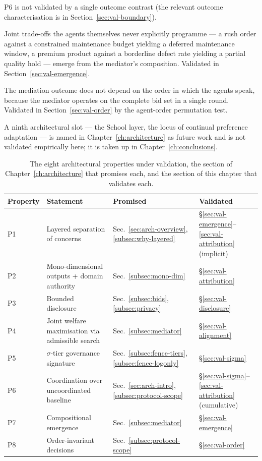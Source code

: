 \begin{description}[leftmargin=2.4em,style=nextline,itemsep=0.25em]
    P6 is not validated by a single outcome contrast (the relevant
    outcome characterisation is in Section~\ref{sec:val-boundary}).
  \item[P7 --- Compositional emergence.] Joint trade-offs the agents
    themselves never explicitly programme --- a rush order against a
    constrained maintenance budget yielding a deferred maintenance
    window, a premium product against a borderline defect rate
    yielding a partial quality hold --- emerge from the mediator's
    composition. Validated in Section~\ref{sec:val-emergence}.
  \item[P8 --- Order-invariant decisions.] The mediation outcome
    does not depend on the order in which the agents speak, because
    the mediator operates on the complete bid set in a single round.
    Validated in Section~\ref{sec:val-order} by the agent-order
    permutation test.
\end{description}

A ninth architectural slot --- the School layer, the locus of
continual preference adaptation --- is named in
Chapter~\ref{ch:architecture} as future work and is not validated
empirically here; it is taken up in
Chapter~\ref{ch:conclusions}.

\begin{table}[ht]
\centering
\caption{The eight architectural properties under validation, the
section of Chapter~\ref{ch:architecture} that promises each, and the
section of this chapter that validates each.}
\label{tab:val-properties}
\small
\begin{tabularx}{\textwidth}{@{}l X l l@{}}
\toprule
\textbf{Property} & \textbf{Statement} & \textbf{Promised} & \textbf{Validated} \\
\midrule
P1 & Layered separation of concerns
   & Sec.~\ref{sec:arch-overview}, \ref{subsec:why-layered}
   & \S\ref{sec:val-emergence}--\ref{sec:val-attribution} (implicit) \\
P2 & Mono-dimensional outputs + domain authority
   & Sec.~\ref{subsec:mono-dim}
   & \S\ref{sec:val-attribution} \\
P3 & Bounded disclosure
   & Sec.~\ref{subsec:bids}, \ref{subsec:privacy}
   & \S\ref{sec:val-disclosure} \\
P4 & Joint welfare maximisation via admissible search
   & Sec.~\ref{subsec:mediator}
   & \S\ref{sec:val-alignment} \\
P5 & $\sigma$-tier governance signature
   & Sec.~\ref{subsec:fence-tiers}, \ref{subsec:fence-logonly}
   & \S\ref{sec:val-sigma} \\
P6 & Coordination over uncoordinated baseline
   & Sec.~\ref{sec:arch-intro}, \ref{subsec:protocol-scope}
   & \S\ref{sec:val-sigma}--\ref{sec:val-attribution} (cumulative) \\
P7 & Compositional emergence
   & Sec.~\ref{subsec:mediator}
   & \S\ref{sec:val-emergence} \\
P8 & Order-invariant decisions
   & Sec.~\ref{subsec:protocol-scope}
   & \S\ref{sec:val-order} \\
\bottomrule
\end{tabularx}
\end{table}

